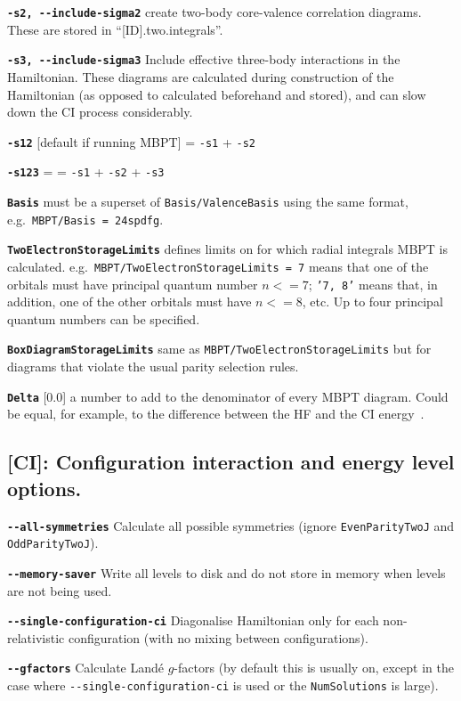 \documentclass[a4paper,11pt]{article}
\newcommand{\option}[1]{\smallskip\noindent\textbf{\texttt{#1}}}
\newcommand{\code}[1]{\texttt{#1}}
\begin{document}
\option{-s2, -{}-include-sigma2} create two-body core-valence correlation diagrams. These are stored in ``[ID].two.integrals''.

\option{-s3, -{}-include-sigma3} Include effective three-body interactions in the Hamiltonian. These diagrams are calculated during construction of the Hamiltonian (as opposed to calculated beforehand and stored), and can slow down the CI process considerably.

\option{-s12} [default if running MBPT] = \texttt{-s1} + \texttt{-s2}

\option{-s123} = = \texttt{-s1} + \texttt{-s2} + \texttt{-s3}

\option{Basis} must be a superset of \texttt{Basis/ValenceBasis} using the same format, e.g.~\texttt{MBPT/Basis = 24spdfg}.

\option{TwoElectronStorageLimits} defines limits on for which radial integrals MBPT is calculated. e.g.~\texttt{MBPT/TwoElectronStorageLimits = 7} means that one of the orbitals must have principal quantum number $n <= 7$; \texttt{'7, 8'} means that, in addition, one of the other orbitals must have $n <= 8$, etc. Up to four principal quantum numbers can be specified.

\option{BoxDiagramStorageLimits} same as \texttt{MBPT/TwoElectronStorageLimits} but for diagrams that violate the usual parity selection rules.

\option{Delta} [0.0] a number to add to the denominator of every MBPT diagram. Could be equal, for example, to the difference between the HF and the CI energy~\cite{kozlov99os,berengut08jpb}.

\subsection{[CI]: Configuration interaction and energy level options.}

\option{-{}-all-symmetries} Calculate all possible symmetries (ignore \code{EvenParityTwoJ} and \code{OddParityTwoJ}).

\option{-{}-memory-saver} Write all levels to disk and do not store in memory when levels are not being used.

\option{-{}-single-configuration-ci} Diagonalise Hamiltonian only for each non-relativistic configuration (with no mixing between configurations).

\option{-{}-gfactors} Calculate Land\'e $g$-factors (by default this is usually on, except in the case where  \code{-{}-single-configuration-ci} is used or the \code{NumSolutions} is large).
\end{document}
